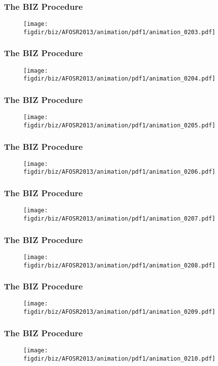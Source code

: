 \documentclass[13pt]{beamer}
\newcommand{\figdir}{../../fig}
\begin{document}
\begin{frame}\frametitle{The BIZ Procedure}\begin{figure}\texttt{[image: \\figdir/biz/AFOSR2013/animation/pdf1/animation\_0203.pdf]}\end{figure}\end{frame}
\begin{frame}\frametitle{The BIZ Procedure}\begin{figure}\texttt{[image: \\figdir/biz/AFOSR2013/animation/pdf1/animation\_0204.pdf]}\end{figure}\end{frame}
\begin{frame}\frametitle{The BIZ Procedure}\begin{figure}\texttt{[image: \\figdir/biz/AFOSR2013/animation/pdf1/animation\_0205.pdf]}\end{figure}\end{frame}
\begin{frame}\frametitle{The BIZ Procedure}\begin{figure}\texttt{[image: \\figdir/biz/AFOSR2013/animation/pdf1/animation\_0206.pdf]}\end{figure}\end{frame}
\begin{frame}\frametitle{The BIZ Procedure}\begin{figure}\texttt{[image: \\figdir/biz/AFOSR2013/animation/pdf1/animation\_0207.pdf]}\end{figure}\end{frame}
\begin{frame}\frametitle{The BIZ Procedure}\begin{figure}\texttt{[image: \\figdir/biz/AFOSR2013/animation/pdf1/animation\_0208.pdf]}\end{figure}\end{frame}
\begin{frame}\frametitle{The BIZ Procedure}\begin{figure}\texttt{[image: \\figdir/biz/AFOSR2013/animation/pdf1/animation\_0209.pdf]}\end{figure}\end{frame}
\begin{frame}\frametitle{The BIZ Procedure}\begin{figure}\texttt{[image: \\figdir/biz/AFOSR2013/animation/pdf1/animation\_0210.pdf]}\end{figure}\end{frame}
\end{document}
